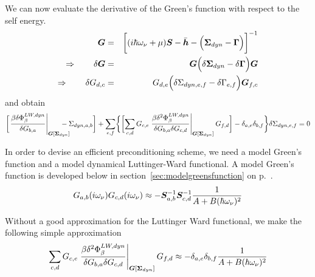 \documentclass[11pt,a4paper]{report}
\begin{document}
We can now evaluate the derivative of the Green's function with
respect to the self energy.
\begin{eqnarray}
\bm{G}&=&\biggl[(i\hbar\omega_\nu+\mu)\bm{S}-\bar{\bm{h}}
-\Bigl(\bm{\Sigma}_{dyn}-\bm{\Gamma}\Bigr)\biggr]^{-1}
\nonumber\\
\Rightarrow\qquad
\delta\bm{G}&=&\bm{G}\Bigl(\delta\bm{\Sigma}_{dyn}
-\delta\bm{\Gamma}\Bigr)\bm{G}
\nonumber\\
\Rightarrow\qquad
\delta{G}_{d,c}&=&{G}_{d,e}\Bigl(\delta{\Sigma}_{dyn,e,f}
-\delta{\Gamma}_{e,f}\Bigr)\bm{G}_{f,c}
\end{eqnarray}
and obtain
\begin{eqnarray}
\biggl[\left.\frac{\beta\delta\Phi^{LW,dyn}_\beta}{\delta G_{b,a}}
\right|_{\mat{G}[\mat{\Sigma}_{dyn}]}\hspace{-0.5cm}
-\Sigma_{dyn,a,b}
\biggr]
+
\sum_{e,f}
\biggl\lbrace
\biggl[\sum_{c,d}
G_{c,e}
\left.\frac{\beta\delta^2\Phi^{LW,dyn}_\beta}
{\delta{G}_{b,a}\delta{G}_{c,d}}
\right|_{\mat{G}[\mat{\Sigma}_{dyn}]}
G_{f,d}
\biggr]-\delta_{a,e}\delta_{b,f}
\biggr\rbrace
\delta\Sigma_{dyn,e,f}
=0
\nonumber\\
\end{eqnarray}


In order to devise an efficient preconditioning scheme, we need a
model Green's function and a model dynamical Luttinger-Ward
functional. A model Green's function is developed below in
section~\ref{sec:modelgreensfunction} on
p.~\pageref{sec:modelgreensfunction}.
\begin{eqnarray}
G_{a,b}(i\omega_\nu)
G_{c,d}(i\omega_\nu)
\approx -\bm{S}^{-1}_{a,b}\bm{S}^{-1}_{c,d}
\frac{1}{A+B(\hbar\omega_\nu)^2}
\end{eqnarray}

Without a good approximation for the Luttinger Ward functional, we
make the following simple approximation
\begin{eqnarray}
\sum_{c,d}
G_{c,e}
\left.\frac{\beta\delta^2\Phi^{LW,dyn}_\beta}
{\delta{G}_{b,a}\delta{G}_{c,d}}
\right|_{\bm{G}[\bm{\Sigma}_{dyn}]}
G_{f,d}
\approx 
-\delta_{a,e}\delta_{b,f}
\frac{1}{A+B(\hbar\omega_\nu)^2}
\end{eqnarray}
\end{document}
